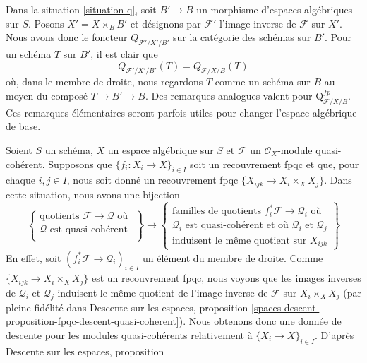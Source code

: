 \begin{remark}
\label{remark-q-base-change}
Dans la situation \ref{situation-q}, soit $B' \to B$ un morphisme d'espaces
algébriques sur $S$. Posons $X' = X \times_B B'$ et désignons par
$\mathcal{F}'$ l'image inverse de $\mathcal{F}$ sur $X'$. Nous avons donc le
foncteur $Q_{\mathcal{F}'/X'/B'}$ sur la catégorie des schémas sur $B'$. Pour
un schéma $T$ sur $B'$, il est clair que
$$
Q_{\mathcal{F}'/X'/B'}(T) = Q_{\mathcal{F}/X/B}(T)
$$
où, dans le membre de droite, nous regardons $T$ comme un schéma sur $B$ au
moyen du composé $T \to B' \to B$. Des remarques analogues valent pour
$\text{Q}^{fp}_{\mathcal{F}/X/B}$. Ces remarques élémentaires seront parfois
utiles pour changer l'espace algébrique de base.
\end{remark}

\begin{remark}
\label{remark-q-sheaf}
Soient $S$ un schéma, $X$ un espace algébrique sur $S$ et $\mathcal{F}$ un
$\mathcal{O}_X$-module quasi-cohérent. Supposons que
$\{f_i : X_i \to X\}_{i \in I}$ soit un recouvrement fpqc et que, pour chaque
$i, j \in I$, nous soit donné un recouvrement fpqc
$\{X_{ijk} \to X_i \times_X X_j\}$. Dans cette situation, nous avons une
bijection
$$
\left\{
\begin{matrix}
\text{quotients }\mathcal{F} \to \mathcal{Q}\text{ où } \\
\mathcal{Q}\text{ est quasi-cohérent}\\
\end{matrix}
\right\}
\longrightarrow
\left\{
\begin{matrix}
\text{familles de quotients }f_i^*\mathcal{F} \to \mathcal{Q}_i
\text{ où } \\
\mathcal{Q}_i\text{ est quasi-cohérent et où }
\mathcal{Q}_i\text{ et }\mathcal{Q}_j\\
\text{induisent le même quotient sur }X_{ijk}
\end{matrix}
\right\}
$$
En effet, soit $(f_i^*\mathcal{F} \to \mathcal{Q}_i)_{i \in I}$ un élément du
membre de droite. Comme $\{X_{ijk} \to X_i \times_X X_j\}$ est un
recouvrement fpqc, nous voyons que les images inverses de $\mathcal{Q}_i$ et
$\mathcal{Q}_j$ induisent le même quotient de l'image inverse de
$\mathcal{F}$ sur $X_i \times_X X_j$ (par pleine fidélité dans Descente sur
les espaces, proposition
\ref{spaces-descent-proposition-fpqc-descent-quasi-coherent}). Nous obtenons
donc une donnée de descente pour les modules quasi-cohérents relativement à
$\{X_i \to X\}_{i \in I}$. D'après Descente sur les espaces, proposition

\end{remark}
